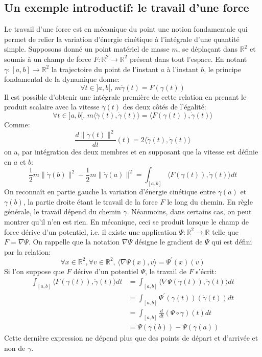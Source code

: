 \subsection{Un exemple introductif: le travail d'une force}
Le travail d'une force est en mécanique du point une notion fondamentale qui
permet de relier la variation d'énergie cinétique à l'intégrale d'une quantité
simple. Supposons donné un point matériel de masse $m$, se déplaçant dans
$\mathbb{R}^2$ et soumis à un champ de force $F \colon \mathbb{R}^2 \to
\mathbb{R}^2$ présent dans tout l'espace. En notant $\gamma \colon [a,b] \to
\mathbb{R}^2$ la trajectoire du point de l'instant $a$ à l'instant $b$, le principe fondamental
de la dynamique donne:
\[
\forall t \in ]a,b[, \, m \ddot{\gamma}(t) = F\left(\gamma(t)\right)
\]
Il est possible d'obtenir une intégrale première de cette relation en prenant le
produit scalaire avec la vitesse $\dot{\gamma}(t)$ des deux côtés de
l'égalité:
\[
\forall t \in ]a,b[, \, m \langle\ddot{\gamma}(t),\dot{\gamma}(t)\rangle =
\langle F\left(\gamma(t)\right), \dot{\gamma}(t) \rangle
\]
Comme:
\[
\frac{d\|\dot{\gamma}(t)\|^2}{dt}(t) = 2
\langle\ddot{\gamma}(t),\dot{\gamma}(t)\rangle
\]
on a, par intégration des deux membres et en supposant que la vitesse est
définie en $a$ et $b$:
\begin{equation}\label{eq:travail_force}
\frac{1}{2}m \|\dot{\gamma}(b)\|^2 - \frac{1}{2}m \|\dot{\gamma}(a)\|^2 =
\int_{[a,b]} \langle F\left(\gamma(t)\right), \dot{\gamma}(t) \rangle
dt
\end{equation}
On reconnaît en partie gauche la variation d'énergie cinétique entre $\gamma(a)$
et $\gamma(b)$, la partie droite étant le travail de la force $F$ le long du
chemin.
En règle générale, le travail dépend du chemin $\gamma$. Néanmoins, dans
certains cas, on peut montrer qu'il n'en est rien. En mécanique, ceci se produit
lorsque le champ de force dérive d'un potentiel, i.e. il existe une application
$\Psi \colon \mathbb{R}^2 \to \mathbb{R}$ telle que $F = \nabla \Psi$. On
rappelle que la notation $\nabla \Psi$ désigne le gradient de $\Psi$ qui est
défini par la relation:
\[
\forall x \in \mathbb{R}^2, \forall v \in \mathbb{R}^2, \, \langle \nabla
\Psi(x),v \rangle = \Psi^\prime(x)(v)
\]
Si l'on suppose que $F$ dérive d'un potentiel $\Psi$, le travail de $F$ s'écrit:
\begin{align*}
\int_{[a,b]} \langle F\left(\gamma(t)\right), \dot{\gamma}(t) \rangle
dt&  = \int_{[a,b]} \langle \nabla \Psi(\gamma(t)), \dot{\gamma}(t)
\rangle dt \\
&= \int_{[a,b]} \Psi^\prime(\gamma(t))(\dot{\gamma}(t)) dt \\
& = \int_{[a,b]} \frac{d}{dt}(\Psi\circ \gamma)(t) dt \\
& = \Psi\left(\gamma(b)\right) - \Psi\left(\gamma(a)\right)
\end{align*}
Cette dernière expression ne dépend plus que des points de départ et d'arrivée
et non de $\gamma$. 

